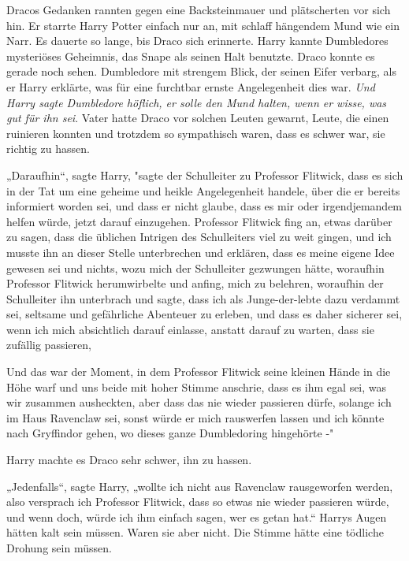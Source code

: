 {Dracos Gedanken rannten gegen eine Backsteinmauer und plätscherten vor sich hin. Er starrte Harry Potter einfach nur an, mit schlaff hängendem Mund wie ein Narr. Es dauerte so lange, bis Draco sich erinnerte. Harry kannte Dumbledores mysteriöses Geheimnis, das Snape als seinen Halt benutzte. Draco konnte es gerade noch sehen. Dumbledore mit strengem Blick, der seinen Eifer verbarg, als er Harry erklärte, was für eine furchtbar ernste Angelegenheit dies war. \emph{Und Harry sagte Dumbledore höflich, er solle den Mund halten, wenn er wisse, was gut für ihn sei}. Vater hatte Draco vor solchen Leuten gewarnt, Leute, die einen ruinieren konnten und trotzdem so sympathisch waren, dass es schwer war, sie richtig zu hassen.

„Daraufhin“, sagte Harry, "sagte der Schulleiter zu Professor Flitwick, dass es sich in der Tat um eine geheime und heikle Angelegenheit handele, über die er bereits informiert worden sei, und dass er nicht glaube, dass es mir oder irgendjemandem helfen würde, jetzt darauf einzugehen. Professor Flitwick fing an, etwas darüber zu sagen, dass die üblichen Intrigen des Schulleiters viel zu weit gingen, und ich musste ihn an dieser Stelle unterbrechen und erklären, dass es meine eigene Idee gewesen sei und nichts, wozu mich der Schulleiter gezwungen hätte, woraufhin Professor Flitwick herumwirbelte und anfing, mich zu belehren, woraufhin der Schulleiter ihn unterbrach und sagte, dass ich als Junge-der-lebte dazu verdammt sei, seltsame und gefährliche Abenteuer zu erleben, und dass es daher sicherer sei, wenn ich mich absichtlich darauf einlasse, anstatt darauf zu warten, dass sie zufällig passieren,

Und das war der Moment, in dem Professor Flitwick seine kleinen Hände in die Höhe warf und uns beide mit hoher Stimme anschrie, dass es ihm egal sei, was wir zusammen ausheckten, aber dass das nie wieder passieren dürfe, solange ich im Haus Ravenclaw sei, sonst würde er mich rauswerfen lassen und ich könnte nach Gryffindor gehen, wo dieses ganze Dumbledoring hingehörte -"

Harry machte es Draco sehr schwer, ihn zu hassen.

„Jedenfalls“, sagte Harry, „wollte ich nicht aus Ravenclaw rausgeworfen werden, also versprach ich Professor Flitwick, dass so etwas nie wieder passieren würde, und wenn doch, würde ich ihm einfach sagen, wer es getan hat.“ Harrys Augen hätten kalt sein müssen. Waren sie aber nicht. Die Stimme hätte eine tödliche Drohung sein müssen.

}
